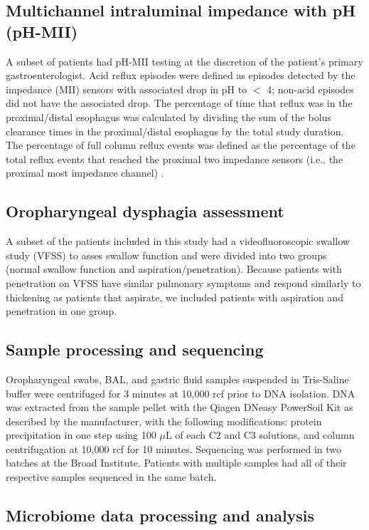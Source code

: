 \documentclass{article}
\begin{document}
\subsection{Multichannel intraluminal impedance with pH (pH-MII)}

A subset of patients had pH-MII testing at the discretion of the patient's primary gastroenterologist. 
Acid reflux episodes were defined as episodes detected by the impedance (MII) sensors with associated drop in pH to $<$ 4; non-acid episodes did not have the associated drop.
The percentage of time that reflux was in the proximal/distal esophagus was calculated by dividing the sum of the bolus clearance times in the proximal/distal esophagus by the total study duration. 
The percentage of full column reflux events was defined as the percentage of the total reflux events that reached the proximal two impedance sensors (i.e., the proximal most impedance channel) \cite{rosen2004impedance}.

\subsection{Oropharyngeal dysphagia assessment}

A subset of the patients included in this study had a videofluoroscopic swallow study (VFSS) to asses swallow function and were divided into two groups (normal swallow function and aspiration/penetration). 
Because patients with penetration on VFSS have similar pulmonary symptoms and respond similarly to thickening as patients that aspirate, we included patients with aspiration and penetration in one group.

\subsection{Sample processing and sequencing}

Oropharyngeal swabs, BAL, and gastric fluid samples suspended in Tris-Saline buffer were centrifuged for 3 minutes at 10,000 rcf prior to DNA isolation. 
DNA was extracted from the sample pellet with the Qiagen DNeasy PowerSoil Kit as described by the manufacturer, with the following modifications: protein precipitation in one step using 100 $\mu$L of each C2 and C3 solutions, and column centrifugation at 10,000 rcf for 10 minutes. 
Sequencing was performed in two batches at the Broad Institute.
Patients with multiple samples had all of their respective samples sequenced in the same batch.

\subsection{Microbiome data processing and analysis}
\end{document}
